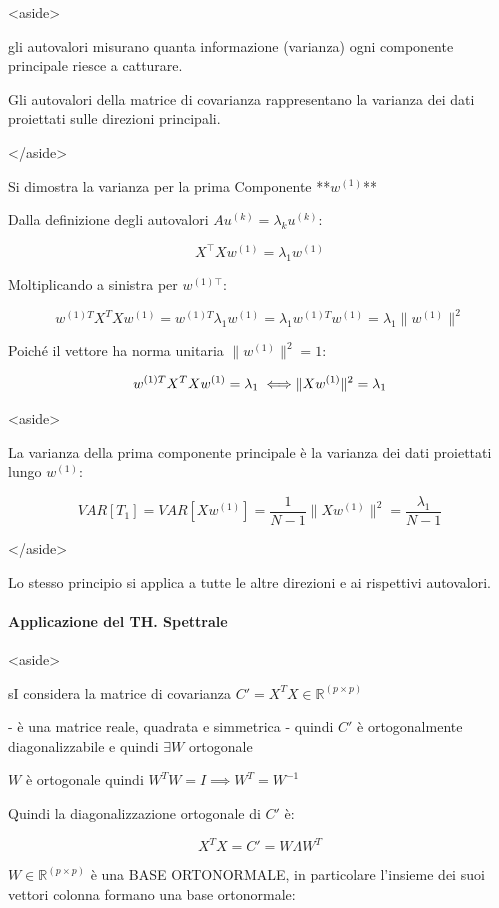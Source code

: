 <aside>


gli autovalori misurano quanta informazione (varianza) ogni componente principale riesce a catturare.

Gli autovalori della matrice di covarianza rappresentano la varianza dei dati proiettati sulle direzioni principali.

</aside>

Si dimostra la varianza per la prima Componente **$w^{(1)}$**

Dalla definizione degli autovalori $Au^{(k)} = \lambda_k u^{(k)}$:

$$
X^\top X w^{(1)} = \lambda_1 w^{(1)}
$$

Moltiplicando a sinistra per $w^{(1)\top}$:

$$
w^{(1)T} X^T X w^{(1)} =w^{(1)T}\lambda_1 w^{(1)}= \lambda_1w^{(1)T}w^{(1)}=\lambda_1 \|w^{(1)}\|^2
$$

Poiché il vettore ha norma unitaria $\|w^{(1)}\|^2 = 1$:

$$
w^{(1)T} X^T X w^{(1)} =\lambda_1\iff\\[.2cm]
\|X w^{(1)}\|^2 =\lambda_1
$$

<aside>


La varianza della prima componente principale è la varianza dei dati proiettati lungo $w^{(1)}$:

$$
VAR[T_1]=VAR[Xw^{(1)}] = \frac{1}{N-1} \|X w^{(1)}\|^2=\frac{\lambda_1}{N-1}
$$

</aside>

Lo stesso principio si applica a tutte le altre direzioni e ai rispettivi autovalori.

\paragraph{Applicazione del TH. Spettrale}

<aside>


sI considera la matrice di covarianza $C'=X^TX\in\mathbb{R}^{(p\times p)}$

- è una matrice reale, quadrata e simmetrica
- quindi $C'$ è ortogonalmente diagonalizzabile e quindi $\exists W$ ortogonale

$W$ è ortogonale quindi $W^TW=I\implies W^T=W^{-1}$

Quindi la diagonalizzazione ortogonale di $C'$ è:

$$
X^TX=C'=W\Lambda W^T
$$

$W\in\mathbb{R}^{(p\times p)}$ è una BASE ORTONORMALE, in particolare l’insieme dei suoi vettori colonna formano una base ortonormale:

